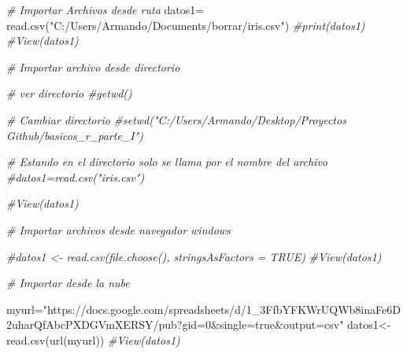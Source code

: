 \documentclass[
]{article}
\newenvironment{Shaded}{\begin{snugshade}}{\end{snugshade}}
\newcommand{\CommentTok}[1]{\textcolor[rgb]{0.56,0.35,0.01}{\textit{#1}}}
\newcommand{\FunctionTok}[1]{\textcolor[rgb]{0.00,0.00,0.00}{#1}}
\newcommand{\NormalTok}[1]{#1}
\newcommand{\OtherTok}[1]{\textcolor[rgb]{0.56,0.35,0.01}{#1}}
\newcommand{\StringTok}[1]{\textcolor[rgb]{0.31,0.60,0.02}{#1}}
\begin{document}
\begin{Shaded}
\begin{Highlighting}[]
\CommentTok{\# Importar Archivos desde ruta}
\NormalTok{datos1}\OtherTok{=} \FunctionTok{read.csv}\NormalTok{(}\StringTok{"C:/Users/Armando/Documents/borrar/iris.csv"}\NormalTok{)}
\CommentTok{\#print(datos1)}
\CommentTok{\#View(datos1)}
\end{Highlighting}
\end{Shaded}

\begin{Shaded}
\begin{Highlighting}[]
\CommentTok{\# Importar archivo desde directorio}

\CommentTok{\# ver directorio}
\CommentTok{\#getwd()}

\CommentTok{\# Cambiar directorio}
\CommentTok{\#setwd("C:/Users/Armando/Desktop/Proyectos Github/basicos\_r\_parte\_I")}

\CommentTok{\# Estando en el directorio solo se llama por el nombre del archivo}
\CommentTok{\#datos1=read.csv("iris.csv")}

\CommentTok{\#View(datos1)}
\end{Highlighting}
\end{Shaded}

\begin{Shaded}
\begin{Highlighting}[]
\CommentTok{\# Importar archivos desde navegador windows}

\CommentTok{\#datos1 \textless{}{-} read.csv(file.choose(), stringsAsFactors = TRUE)}
\CommentTok{\#View(datos1)}
\end{Highlighting}
\end{Shaded}

\begin{Shaded}
\begin{Highlighting}[]
\CommentTok{\# Importar desde la nube}

\NormalTok{myurl}\OtherTok{=}\StringTok{"https://docs.google.com/spreadsheets/d/1\_3FfbYFKWrUQWb8inaFe6D2uharQfAbcPXDGVmXERSY/pub?gid=0\&single=true\&output=csv"}
\NormalTok{datos1}\OtherTok{\textless{}{-}}\FunctionTok{read.csv}\NormalTok{(}\FunctionTok{url}\NormalTok{(myurl))}
\CommentTok{\#View(datos1)}
\end{Highlighting}
\end{Shaded}
\end{document}
